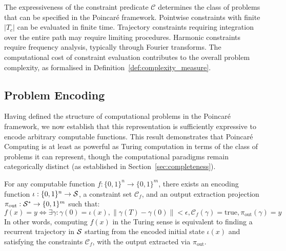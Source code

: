 \begin{remark}
\label{rem:constraint_complexity}
The expressiveness of the constraint predicate $\mathcal{C}$ determines the class of problems that can be specified in the Poincaré framework. Pointwise constraints with finite $|T_c|$ can be evaluated in finite time. Trajectory constraints requiring integration over the entire path may require limiting procedures. Harmonic constraints require frequency analysis, typically through Fourier transforms. The computational cost of constraint evaluation contributes to the overall problem complexity, as formalised in Definition~\ref{def:complexity_measure}.
\end{remark}

\subsection{Problem Encoding}

Having defined the structure of computational problems in the Poincaré framework, we now establish that this representation is sufficiently expressive to encode arbitrary computable functions. This result demonstrates that Poincaré Computing is at least as powerful as Turing computation in terms of the class of problems it can represent, though the computational paradigms remain categorically distinct (as established in Section~\ref{sec:completeness}).

\begin{proposition}
\label{prop:encoding_sufficiency}
For any computable function $f: \{0,1\}^n \to \{0,1\}^m$, there exists an encoding function $\iota: \{0,1\}^n \to \mathcal{S}$, a constraint set $\mathcal{C}_f$, and an output extraction projection $\pi_{\text{out}}: \mathcal{S}^* \to \{0,1\}^m$ such that:
\begin{equation}
f(x) = y \iff \exists \gamma: \gamma(0) = \iota(x), \|\gamma(T) - \gamma(0)\| < \epsilon, \mathcal{C}_f(\gamma) = \text{true}, \pi_{\text{out}}(\gamma) = y
\label{eq:encoding_equivalence}
\end{equation}
In other words, computing $f(x)$ in the Turing sense is equivalent to finding a recurrent trajectory in $\mathcal{S}$ starting from the encoded initial state $\iota(x)$ and satisfying the constraints $\mathcal{C}_f$, with the output extracted via $\pi_{\text{out}}$.
\end{proposition}

